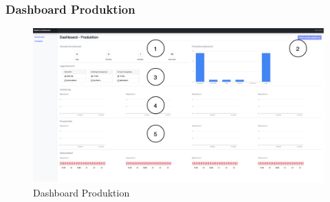 \subsubsection*{Dashboard Produktion}
\begin{figure}[h]
    \centering
    \includegraphics[width=1\textwidth]{ausarbeitung-latex/img/DashboardProduktion.png}
    \caption{Dashboard Produktion}
    \label{fig:DashProd}
\end{figure}

